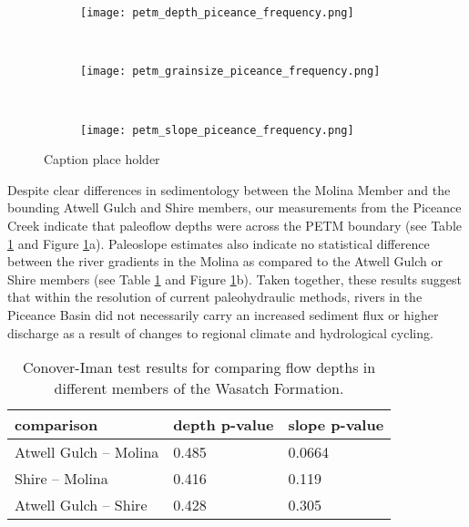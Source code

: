 \documentclass[draft]{compact_proposal}\usepackage[]{graphicx}\usepackage[]{color}
\begin{document}
\begin{figure}[H]
  
  \centering
  \begin{subfigure}[t]{0.25\textwidth}
  \centering
  \texttt{[image: petm\_depth\_piceance\_frequency.png]}
  \end{subfigure}%
  ~ 
  \begin{subfigure}[t]{0.25\textwidth}
  \centering
  \texttt{[image: petm\_grainsize\_piceance\_frequency.png]}
  \end{subfigure}
  ~ 
  \begin{subfigure}[t]{0.4\textwidth}
  \centering
  \texttt{[image: petm\_slope\_piceance\_frequency.png]}
  \end{subfigure}
  \caption{Caption place holder}
  \label{fig:paleo_geom}
\end{figure}

Despite clear differences in sedimentology between the Molina Member and the bounding Atwell Gulch and Shire members, our measurements from the Piceance Creek indicate that paleoflow depths were  across the PETM boundary (see Table \ref{tab:paleo_geom} and Figure \ref{fig:paleo_geom}a).
Paleoslope estimates also indicate no statistical difference between the river gradients in the Molina as compared to the Atwell Gulch or Shire members (see Table \ref{tab:paleo_geom} and Figure \ref{fig:paleo_geom}b). 
Taken together, these results suggest that within the resolution of current paleohydraulic methods, rivers in the Piceance Basin did not necessarily carry an increased sediment flux or higher discharge as a result of changes to regional climate and hydrological cycling.

\begin{table}[H]
\centering
\begin{tabular}{l | l | l}
comparison & depth p-value & slope p-value \\
\hline
Atwell Gulch -- Molina & 0.485 & 0.0664 \\
Shire -- Molina & 0.416 & 0.119 \\
Atwell Gulch -- Shire & 0.428 & 0.305 \\
\end{tabular}
\caption{Conover-Iman test results for comparing flow depths in different members of the Wasatch Formation.}
\label{tab:paleo_geom}
\end{table}
\end{document}
